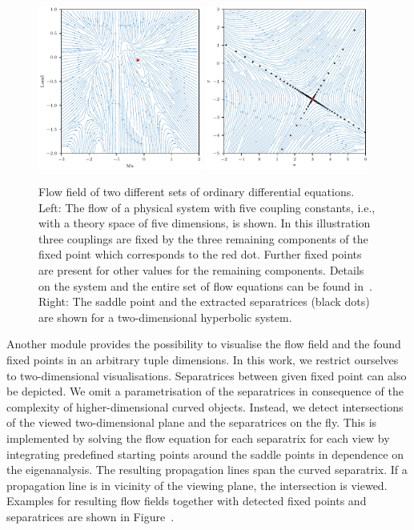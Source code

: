 \documentclass[paper=a4,11pt,bibliography=totoc]{scrartcl}
\begin{document}
\begin{figure}
	\includegraphics[width=0.48\textwidth]{flow_field_pure2}
	\hfill\includegraphics[width=0.48\textwidth]{flow_field1_sep}
	\caption{Flow field of two different sets of ordinary differential equations. Left: The flow of a physical system with five coupling constants, i.e., with a theory space of five dimensions, is shown. In this illustration three couplings are fixed by the three remaining components of the fixed point which corresponds to the red dot. Further fixed points are present for other values for the remaining components. Details on the system and the entire set of flow equations can be found in~\cite{Pawlowski2018}. Right: The saddle point and the extracted separatrices (black dots) are shown for a two-dimensional hyperbolic system.}
	\label{fig:threedimenionsalsystem}
\end{figure}

Another module provides the possibility to visualise the flow field and the found fixed points in an arbitrary tuple dimensions. In this work, we restrict ourselves to two-dimensional visualisations. Separatrices between given fixed point can also be depicted. We omit a parametrisation of the separatrices in consequence of the complexity of higher-dimensional curved objects. Instead, we detect intersections of the viewed two-dimensional plane and the separatrices on the fly. This is implemented by solving the flow equation for each separatrix for each view by integrating predefined starting points around the saddle points in dependence on the eigenanalysis. The resulting propagation lines span the curved separatrix. If a propagation line is in vicinity of the viewing plane, the intersection is viewed. Examples for resulting flow fields together with detected fixed points and separatrices are shown in Figure~.
\end{document}
